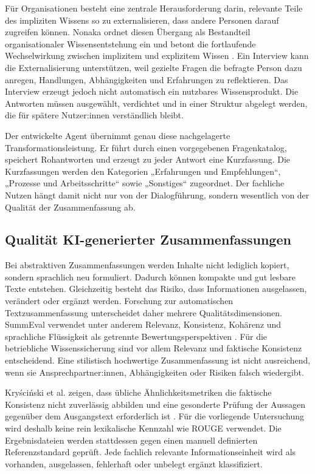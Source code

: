 \documentclass[
  10pt,
  ngerman,
  a4paper,
  toc=graduated,
  numbers=noenddot,
  headings=standardclasses,
  nonumberlist
]{scrartcl}
\begin{document}
Für Organisationen besteht eine zentrale Herausforderung darin, relevante Teile des impliziten Wissens so zu externalisieren, dass andere Personen darauf zugreifen können. Nonaka ordnet diesen Übergang als Bestandteil organisationaler Wissensentstehung ein und betont die fortlaufende Wechselwirkung zwischen implizitem und explizitem Wissen \cite{nonaka1994}. Ein Interview kann die Externalisierung unterstützen, weil gezielte Fragen die befragte Person dazu anregen, Handlungen, Abhängigkeiten und Erfahrungen zu reflektieren. Das Interview erzeugt jedoch nicht automatisch ein nutzbares Wissensprodukt. Die Antworten müssen ausgewählt, verdichtet und in einer Struktur abgelegt werden, die für spätere Nutzer:innen verständlich bleibt.

Der entwickelte Agent übernimmt genau diese nachgelagerte Transformationsleistung. Er führt durch einen vorgegebenen Fragenkatalog, speichert Rohantworten und erzeugt zu jeder Antwort eine Kurzfassung. Die Kurzfassungen werden den Kategorien „Erfahrungen und Empfehlungen“, „Prozesse und Arbeitsschritte“ sowie „Sonstiges“ zugeordnet. Der fachliche Nutzen hängt damit nicht nur von der Dialogführung, sondern wesentlich von der Qualität der Zusammenfassung ab.

\subsection{Qualität KI-generierter Zusammenfassungen}

Bei abstraktiven Zusammenfassungen werden Inhalte nicht lediglich kopiert, sondern sprachlich neu formuliert. Dadurch können kompakte und gut lesbare Texte entstehen. Gleichzeitig besteht das Risiko, dass Informationen ausgelassen, verändert oder ergänzt werden. Forschung zur automatischen Textzusammenfassung unterscheidet daher mehrere Qualitätsdimensionen. SummEval verwendet unter anderem Relevanz, Konsistenz, Kohärenz und sprachliche Flüssigkeit als getrennte Bewertungsperspektiven \cite{fabbri2021}. Für die betriebliche Wissenssicherung sind vor allem Relevanz und faktische Konsistenz entscheidend. Eine stilistisch hochwertige Zusammenfassung ist nicht ausreichend, wenn sie Ansprechpartner:innen, Abhängigkeiten oder Risiken falsch wiedergibt.

Kryściński et al. zeigen, dass übliche Ähnlichkeitsmetriken die faktische Konsistenz nicht zuverlässig abbilden und eine gesonderte Prüfung der Aussagen gegenüber dem Ausgangstext erforderlich ist \cite{kryscinski2020}. Für die vorliegende Untersuchung wird deshalb keine rein lexikalische Kennzahl wie ROUGE verwendet. Die Ergebnisdateien werden stattdessen gegen einen manuell definierten Referenzstandard geprüft. Jede fachlich relevante Informationseinheit wird als vorhanden, ausgelassen, fehlerhaft oder unbelegt ergänzt klassifiziert.
\end{document}
